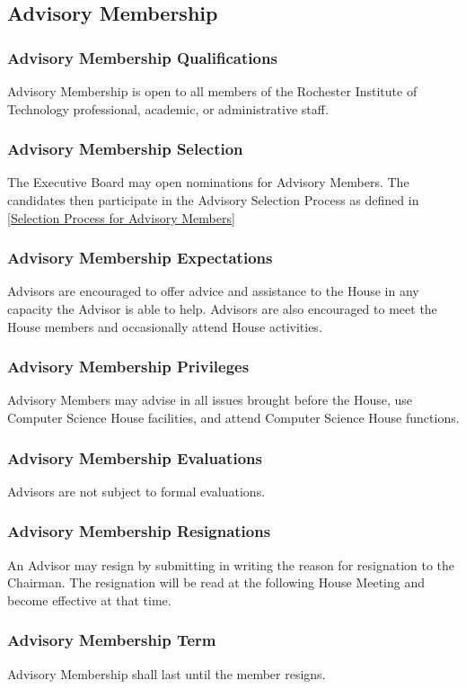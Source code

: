 \documentclass{article}
\newcommand{\asection}[1]{\subsection{#1} \label{#1}}
\newcommand{\asubsection}[1]{\subsubsection{#1} \label{#1}}
\begin{document}
\asection{Advisory Membership}
\asubsection{Advisory Membership Qualifications}
Advisory Membership is open to all members of the Rochester Institute of Technology professional, academic, or administrative staff.
\asubsection{Advisory Membership Selection}
The Executive Board may open nominations for Advisory Members.
The candidates then participate in the Advisory Selection Process as defined in \ref{Selection Process for Advisory Members}
\asubsection{Advisory Membership Expectations}
Advisors are encouraged to offer advice and assistance to the House in any capacity the Advisor is able to help.
Advisors are also encouraged to meet the House members and occasionally attend House activities.
\asubsection{Advisory Membership Privileges}
Advisory Members may advise in all issues brought before the House, use Computer Science House facilities, and attend Computer Science House functions.
\asubsection{Advisory Membership Evaluations}
Advisors are not subject to formal evaluations.
\asubsection{Advisory Membership Resignations}
An Advisor may resign by submitting in writing the reason for resignation to the Chairman.
The resignation will be read at the following House Meeting and become effective at that time.
\asubsection{Advisory Membership Term}
Advisory Membership shall last until the member resigns.
\end{document}
